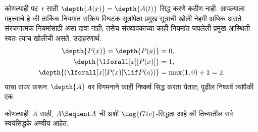 कोणत्याही पद~$t$ साठी $\depth{A(x)} =
\depth{A(t)}$ सिद्ध करणे कठीण नाही. आपल्याला
महत्त्वाचे हे की तार्किक नियमात सक्रिय विघटक सूत्रांपेक्षा प्रमुख
सूत्राची खोली नेहमी अधिक असते. संरचनात्मक
नियमांसाठी असा दावा नाही; तसेच संख्यापकाच्या काही
 नियमांत जपलेली प्रमुख आस्थिती स्वतः त्याच
खोलीची असते. उदाहरणार्थ:
\begin{align*}
\depth{P(x)} = \depth{P(a)} & = 0,\\
\depth{\lforall[x][P(x)]} & = 1,\\
\depth{(\lforall[x][P(x)] \lif P(a))} & = \max(1,0) + 1 = 2.
\end{align*}
याचा वापर करून~$\depth{A}$ वर विगमनाने काही
निष्कर्ष सिद्ध करता येतात; पुढील निष्कर्ष त्यांपैकी एक.

\begin{prop}\label{pt:seq:ex:prop:G1c-axioms}
कोणत्याही~$A$ साठी, $A \Sequent A$ ची अशी
$\Log{G1c}$-सिद्धता आहे की तिच्यातील सर्व
स्वयंसिद्धके अण्वीय आहेत.
\end{prop}

